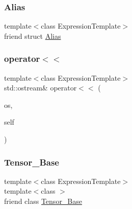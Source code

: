 \subsubsection{\texorpdfstring{Alias}{Alias}}
{\footnotesize\ttfamily template$<$class Expression\+Template$>$ \\
friend struct \hyperlink{structbc_1_1tensors_1_1Tensor__Base_1_1Alias}{Alias}\hspace{0.3cm}{\ttfamily [friend]}}

\mbox{\label{classbc_1_1tensors_1_1Tensor__Base_a44788e503facb5a5c96020dac445a9a0}} 
\subsubsection{\texorpdfstring{operator$<$$<$}{operator<<}}
{\footnotesize\ttfamily template$<$class Expression\+Template$>$ \\
std\+::ostream\& operator$<$$<$ (\begin{DoxyParamCaption}\item[{std\+::ostream \&}]{os,  }\item[{const \hyperlink{classbc_1_1tensors_1_1Tensor__Base}{Tensor\+\_\+\+Base}$<$ Expression\+Template $>$ \&}]{self }\end{DoxyParamCaption})\hspace{0.3cm}{\ttfamily [friend]}}

\mbox{\label{classbc_1_1tensors_1_1Tensor__Base_a794d203bce037da65d945527a3fe4837}} 
\subsubsection{\texorpdfstring{Tensor\+\_\+\+Base}{Tensor\_Base}}
{\footnotesize\ttfamily template$<$class Expression\+Template$>$ \\
template$<$class $>$ \\
friend class \hyperlink{classbc_1_1tensors_1_1Tensor__Base}{Tensor\+\_\+\+Base}\hspace{0.3cm}{\ttfamily [friend]}}



